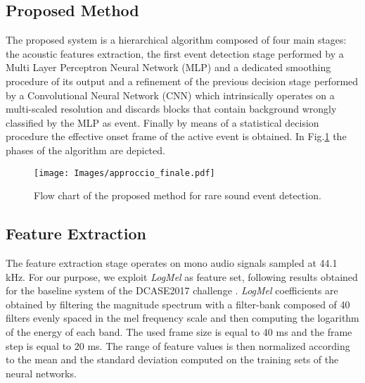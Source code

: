 \documentclass{article}
\begin{document}
\begin{sloppy}
\section{Proposed Method}
\label{sec:proposed-meth}
The proposed system is a hierarchical algorithm composed of four main stages: the acoustic features extraction, the first event detection stage performed by a Multi Layer Perceptron Neural Network (MLP) and a dedicated smoothing procedure of its output and a refinement of the previous decision stage performed by a Convolutional Neural Network (CNN) which intrinsically operates on a multi-scaled resolution and discards blocks that contain background wrongly classified by the MLP as event. Finally by means of a statistical decision procedure the effective onset frame of the active event is obtained. In Fig.\ref{fig:flow-chart} the phases of the algorithm are depicted.

\begin{figure}[t]
  \centering
  \centerline{\texttt{[image: Images/approccio\_finale.pdf]}}
  \caption{Flow chart of the proposed method for rare sound event detection.}
  \label{fig:flow-chart}
\end{figure}

\subsection{Feature Extraction}
The feature extraction stage operates on mono audio signals sampled at 44.1 kHz. For our purpose, we exploit \textit{LogMel} as feature set, following results obtained for the baseline system of the DCASE2017 challenge \cite{DCASE2017challenge}. \textit{LogMel} coefficients are obtained by filtering the magnitude spectrum with a filter-bank composed of 40 filters evenly spaced in the mel frequency scale and then computing the logarithm of the energy of each band. The used frame size is equal to 40 ms and the frame step is equal to 20 ms. 
The range of feature values is then normalized according to the mean and the standard deviation computed on the training sets of the neural networks.

\end{sloppy}
\end{document}
